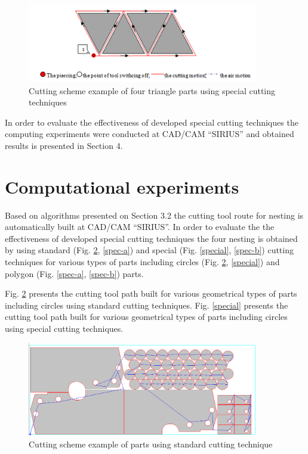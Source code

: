 \documentclass[runningheads]{llncs}
\begin{document}
\begin{figure}
  \begin{center}
  \includegraphics[width=0.9\textwidth]{tri.png}
  \caption{Cutting scheme example of four triangle parts using special cutting techniques}
  \label{tri}
  \end{center}
\end{figure}

In order to evaluate the effectiveness
of developed special cutting techniques
the computing experiments were conducted at CAD/CAM ``SIRIUS''
and obtained results is presented in Section 4.

\section{Computational experiments}

Based on algorithms presented on Section 3.2
the cutting tool route for nesting is automatically built at CAD/CAM ``SIRIUS''.
In order to evaluate the the effectiveness of developed special cutting techniques
the four nesting is obtained by using standard (Fig. \ref{std}, \ref{spec-a})
and special (Fig. \ref{special}, \ref{spec-b})
cutting techniques for various types of parts including circles
(Fig. \ref{std}, \ref{special}) and polygon (Fig. \ref{spec-a}, \ref{spec-b}) parts.

Fig. \ref{std} presents the cutting tool path
built for various geometrical types of parts including circles using standard cutting techniques.
Fig. \ref{special} presents the cutting tool path built for various geometrical types of parts
including circles using special cutting techniques.

\begin{figure}
  \begin{center}
  \includegraphics[width=0.9\textwidth]{std.png}
  \caption{Cutting scheme example of parts using standard cutting technique}
  \label{std}
  \end{center}
\end{figure}
\end{document}
